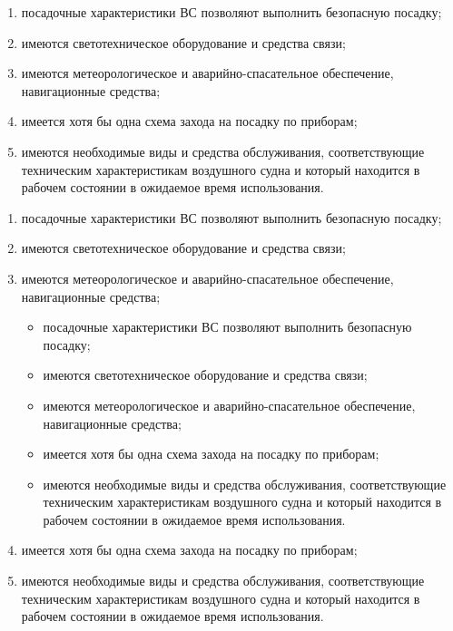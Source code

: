 \begin{enumerate}[label=\alph*),ref=\alph*]
    \item посадочные характеристики ВС позволяют выполнить безопасную посадку;
    \item имеются светотехническое оборудование и средства связи;
    \item имеются метеорологическое и аварийно-спасательное обеспечение, навигационные средства;
    \item имеется хотя бы одна схема захода на посадку по приборам;
    \item имеются необходимые виды и средства обслуживания, соответствующие техническим характеристикам воздушного судна и который находится в рабочем состоянии в ожидаемое время использования.    
\end{enumerate}

\begin{enumerate}[label=\asbuk*),ref=\asbuk*]
    \item посадочные характеристики ВС позволяют выполнить безопасную посадку;
    \item имеются светотехническое оборудование и средства связи;
    \item имеются метеорологическое и аварийно-спасательное обеспечение, навигационные средства;
    \begin{itemize}
        \item посадочные характеристики ВС позволяют выполнить безопасную посадку;
        \item имеются светотехническое оборудование и средства связи;
        \item имеются метеорологическое и аварийно-спасательное обеспечение, навигационные средства;
        \item имеется хотя бы одна схема захода на посадку по приборам;
        \item имеются необходимые виды и средства обслуживания, соответствующие техническим характеристикам воздушного судна и который находится в рабочем состоянии в ожидаемое время использования.
    \end{itemize}
    \item имеется хотя бы одна схема захода на посадку по приборам;
    \item имеются необходимые виды и средства обслуживания, соответствующие техническим характеристикам воздушного судна и который находится в рабочем состоянии в ожидаемое время использования.    
\end{enumerate}

